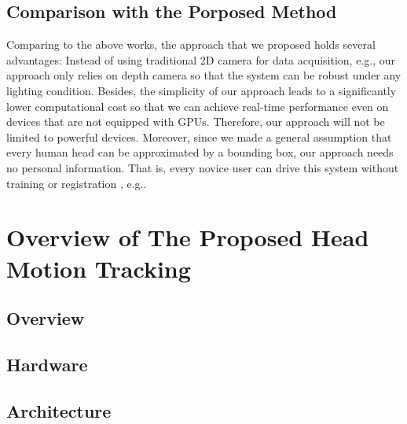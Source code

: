 \subsection{Comparison with the Porposed Method}
Comparing to the above works, the approach that we proposed holds several advantages: Instead of using traditional 2D camera for data acquisition, e.g.\cite{Murphy:09:SURVEY}, our approach only relies on depth camera so that the system can be robust under any lighting condition. Besides, the simplicity of our approach leads to a significantly lower computational cost so that we can achieve real-time performance even on devices that are not equipped with GPUs. Therefore, our approach will not be limited to powerful devices. Moreover, since we made a general assumption that every human head can be approximated  by a bounding box, our approach needs no personal information. That is, every novice user can drive this system without training or registration , e.g.\cite{Weise:11:RPBFA}.

\section{Overview of The Proposed Head Motion Tracking}

\subsection{Overview}


\subsection{Hardware}

\subsection{Architecture}
